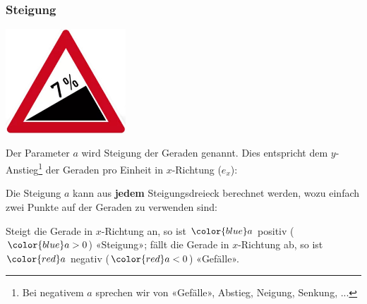 \newpage


\subsubsection{Steigung}
  \includegraphics[width=4.5cm]{tals/trig1/img/starkeSteigung.jpg}

Der Parameter $a$ wird Steigung der Geraden genannt. Dies entspricht
dem $y$-Anstieg\footnote{Bei negativem $a$ sprechen wir von «Gefälle»,
  Abstieg, Neigung, Senkung, ...} der Geraden pro Einheit in $x$-Richtung ($e_x$):



\newpage

Die Steigung $a$ kann aus \textbf{jedem} Steigungsdreieck berechnet werden,
wozu einfach zwei Punkte auf der Geraden zu verwenden sind:



Steigt die Gerade in $x$-Richtung an, so ist ${\color{blue}a}$ positiv
(${\color{blue}a>0}$) {\color{blue} «Steigung»};
fällt die Gerade in $x$-Richtung ab, so ist ${\color{red}a}$ negativ
(${\color{red}a<0}$) {\color{red} «Gefälle»}.

